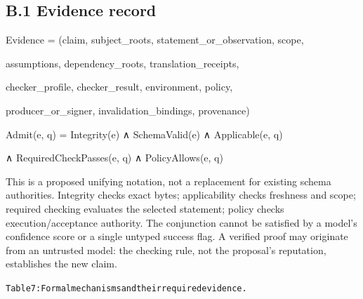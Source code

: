 \documentclass{article}
\begin{document}
\subsection*{B.1 Evidence record}

\noindent Evidence = (claim, subject\_roots, statement\_or\_observation, scope,\par
\noindent assumptions, dependency\_roots, translation\_receipts,\par
\noindent checker\_profile, checker\_result, environment, policy,\par
\noindent producer\_or\_signer, invalidation\_bindings, provenance)\par
\noindent Admit(e, q) = Integrity(e) ∧ SchemaValid(e) ∧ Applicable(e, q)\par
\noindent ∧ RequiredCheckPasses(e, q) ∧ PolicyAllows(e, q)\par

This is a proposed unifying notation, not a replacement for existing schema authorities. Integrity
checks exact bytes; applicability checks freshness and scope; required checking evaluates the selected
statement; policy checks execution/acceptance authority. The conjunction cannot be satisfied by a
model’s confidence score or a single untyped success flag. A verified proof may originate from an
untrusted model: the checking rule, not the proposal’s reputation, establishes the new claim.


\begingroup\fontsize{7}{8.4}\selectfont
\begin{alltt}
Table 7: Formal mechanisms and their required evidence.
\end{alltt}\endgroup
\end{document}

